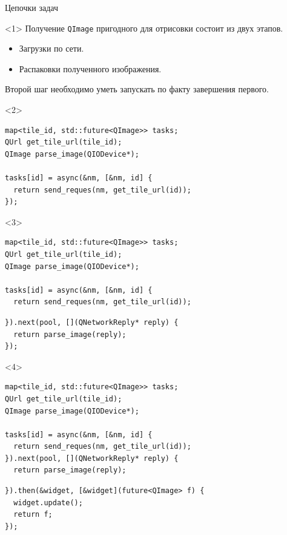 \documentclass[aspectratio=169,hyperref={unicode},17pt]{beamer}
\begin{document}
\begin{frame}[fragile,t]{Цепочки задач}
\begin{onlyenv}<1>
Получение \texttt{QImage} пригодного для отрисовки состоит из двух этапов.
\begin{itemize}
 \item Загрузки по сети.
 \item Распаковки полученного изображения.
\end{itemize}
Второй шаг необходимо уметь запускать по факту завершения первого.
\end{onlyenv}
\begin{onlyenv}<2>
\begin{lstlisting}[style=cppcode,belowskip=0pt]
map<tile_id, std::future<QImage>> tasks;
QUrl get_tile_url(tile_id);
QImage parse_image(QIODevice*);

tasks[id] = async(&nm, [&nm, id] {
  return send_reques(nm, get_tile_url(id));
});
\end{lstlisting}
\end{onlyenv}
\begin{onlyenv}<3>
\begin{lstlisting}[style=cppcode,belowskip=0pt]
map<tile_id, std::future<QImage>> tasks;
QUrl get_tile_url(tile_id);
QImage parse_image(QIODevice*);

tasks[id] = async(&nm, [&nm, id] {
  return send_reques(nm, get_tile_url(id));
\end{lstlisting}
\begin{lstlisting}[style=cppcode,backgroundcolor=\color{gray!30},aboveskip=0pt,belowskip=0pt]
}).next(pool, [](QNetworkReply* reply) {
  return parse_image(reply);
});
\end{lstlisting}
\end{onlyenv}
\begin{onlyenv}<4>
\begin{lstlisting}[style=cppcode,belowskip=0pt]
map<tile_id, std::future<QImage>> tasks;
QUrl get_tile_url(tile_id);
QImage parse_image(QIODevice*);

tasks[id] = async(&nm, [&nm, id] {
  return send_reques(nm, get_tile_url(id));
}).next(pool, [](QNetworkReply* reply) {
  return parse_image(reply);
\end{lstlisting}
\begin{lstlisting}[style=cppcode,backgroundcolor=\color{gray!30},aboveskip=0pt,belowskip=0pt]
}).then(&widget, [&widget](future<QImage> f) {
  widget.update();
  return f;
});
\end{lstlisting}
\end{onlyenv}
\end{frame}
\end{document}
